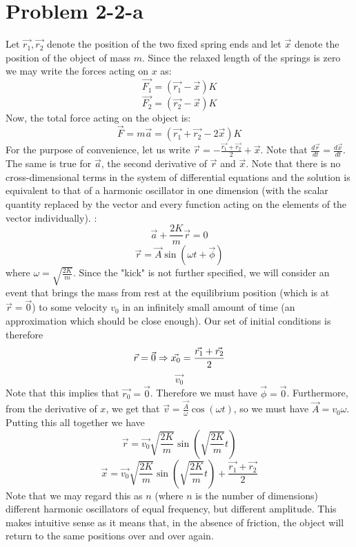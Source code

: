 \section*{Problem 2-2-a}
Let $\vec{r_1},\vec{r_2}$ denote the position of the two fixed spring ends and let $\vec{x}$ denote the position of the object of mass $m$. Since the relaxed length of the springs is zero we may write the forces acting on $x$ as:
\[ \vec{F_1} = (\vec{r_1} - \vec{x}) K \]
\[ \vec{F_2} = (\vec{r_2} - \vec{x}) K \]
Now, the total force acting on the object is:
\[ \vec{F} = m\vec{a} = \left(\vec{r_1} + \vec{r_2} - 2\vec{x}\right) K \]
For the purpose of convenience, let us write $\vec{r}= -\frac{\vec{r_1} + \vec{r_2}}{2} + \vec{x}$. Note that $\frac{d\vec{r}}{dt}=\frac{d\vec{x}}{dt}$. The same is true for $\vec{a}$, the second derivative of $\vec{r}$ and $\vec{x}$. 
Note that there is no cross-dimensional terms in the system of differential equations and the solution is equivalent to that of a harmonic oscillator in one dimension (with the scalar quantity replaced by the vector and every function acting on the elements of the vector individually). :
\[ \vec{a} + \frac{2K}{m}\vec{r} = 0 \]
\[ \vec{r} = \vec{A}\sin(\omega t+\vec{\phi}) \]
where $\omega=\sqrt{\frac{2K}{m}}$. Since the "kick" is not further specified, we will consider an event that brings the mass from rest at the equilibrium position (which is at $\vec{r}=\vec{0}$)  to some velocity $v_0$ in an infinitely small amount of time (an approximation which should be close enough). Our set of initial conditions is therefore 
\[ \vec{r} = \vec{0} \Rightarrow \vec{x_0}=\dfrac{\vec{r_1}+\vec{r_2}}{2} \]
\[ \vec{v_0} \]
Note that this implies that $\vec{r_0}=\vec{0} $. Therefore we must have $\vec{\phi}=\vec{0}$. Furthermore, from the derivative of $x$, we get that $\vec{v}=\frac{\vec{A}}{\omega}\cos(\omega t)$, so we must have $\vec{A}=v_0\omega$.
Putting this all together we have 
\[ \vec{r} = \vec{v_0}\sqrt{\frac{2K}{m}}\sin\left(\sqrt{\frac{2K}{m}}t\right) \]
\[ \vec{x} = \vec{v_0}\sqrt{\frac{2K}{m}}\sin\left(\sqrt{\frac{2K}{m}}t\right)  + \frac{\vec{r_1}+\vec{r_2}}{2} \]
Note that we may regard this as $n$ (where $n$ is the number of dimensions) different harmonic oscillators of equal frequency, but different amplitude. This makes intuitive sense as it means that, in the absence of friction, the object will return to the same positions over and over again.
